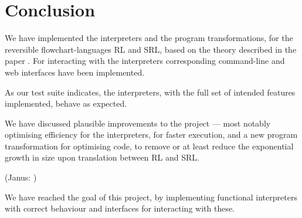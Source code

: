 \chapter*{Conclusion}

We have implemented the interpreters and the program transformations, for the reversible flowchart-languages RL and SRL, based on the theory described in the paper \cite{REV}.
For interacting with the interpreters corresponding command-line and web interfaces have been implemented.

As our test suite indicates, the interpreters, with the full set of intended features implemented, behave as expected.

We have discussed plausible improvements to the project --- most notably optimising efficiency for the interpreters, for faster execution, and a new program transformation for optimising code, to remove or at least reduce the exponential growth in size upon translation between RL and SRL.

(Janus: \cite{JAN})

We have reached the goal of this project, by implementing functional interpreters with correct behaviour and interfaces for interacting with these.
